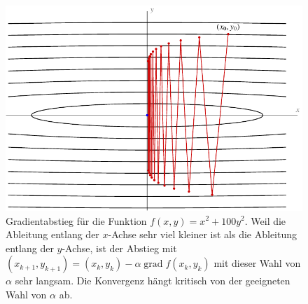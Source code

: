 %
%
%
\begin{figure}
\centering
\includegraphics{chapters/070-direkt/images/abstieg.pdf}
\caption{Gradientabstieg für die Funktion $f(x,y)=x^2+100y^2$.
Weil die Ableitung entlang der $x$-Achse sehr viel kleiner ist als
die Ableitung entlang der $y$-Achse, ist der Abstieg mit 
$(x_{k+1},y_{k+1}) = (x_k,y_k) -\alpha \operatorname{grad}f(x_k,y_k)$
mit dieser Wahl von $\alpha$ sehr langsam.
Die Konvergenz hängt kritisch von der geeigneten Wahl von $\alpha$ ab.
\label{buch:direkt:gradient:fig:abstieg}}
\end{figure}

